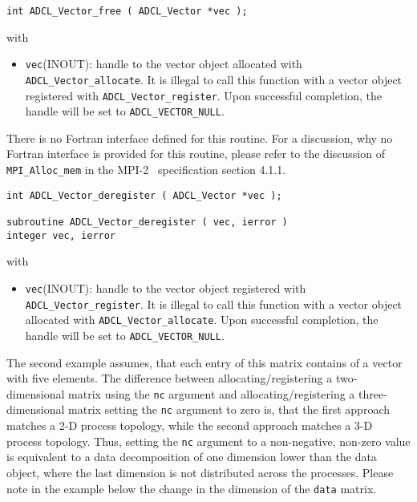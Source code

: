 \begin{verbatim}
int ADCL_Vector_free ( ADCL_Vector *vec );
\end{verbatim}
with
\begin{itemize}
\item {\tt vec}(INOUT): handle to the vector object allocated with {\tt
    ADCL\_Vector\-\_allocate}. It is illegal to call this function with a
  vector object registered with {\tt ADCL\_Vector\_register}. Upon successful
  completion, the handle will be set to {\tt ADCL\_VECTOR\_NULL}.
\end{itemize}
There is no Fortran interface defined for this routine. For a discussion, why
no Fortran interface is provided for this routine, please refer to the
discussion of {\tt MPI\_Alloc\_mem} in the MPI-2~\cite{mpi2} specification
section 4.1.1.  \hspace{1cm}

\begin{verbatim}
int ADCL_Vector_deregister ( ADCL_Vector *vec );

subroutine ADCL_Vector_deregister ( vec, ierror )
integer vec, ierror
\end{verbatim}
with
\begin{itemize}
\item {\tt vec}(INOUT): handle to the vector object registered with {\tt
    ADCL\_Vector\-\_register}. It is illegal to call this function with a
  vector object allocated with {\tt ADCL\_Vector\_allocate}. Upon successful
  completion, the handle will be set to {\tt ADCL\_VECTOR\_NULL}.
\end{itemize}


The second example assumes, that each entry of this matrix contains of a
vector with five elements. The difference between allocating/registering a
two-dimensional matrix using the {\tt nc} argument and allocating/registering
a three-dimensional matrix setting the {\tt nc} argument to zero is, that the
first approach matches a 2-D process topology, while the second approach
matches a 3-D process topology. Thus, setting the {\tt nc} argument to a
non-negative, non-zero value is equivalent to a data decomposition of one
dimension lower than the data object, where the last dimension is not
distributed across the processes. Please note in the example below the change
in the dimension of the {\tt data} matrix.

